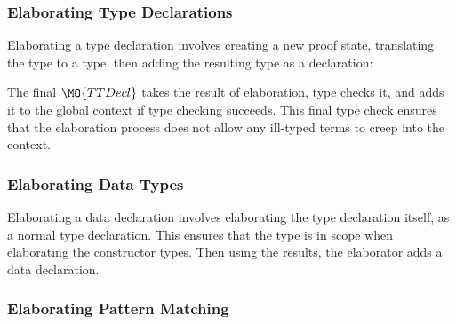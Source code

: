 \subsubsection{Elaborating Type Declarations}

Elaborating a type declaration involves creating a new proof state,
translating the \IdrisM{} type to a \TT{} type, then adding the resulting type
as a \TT{} declaration:


The final $\MO{TTDecl}$ takes the result of elaboration, type checks it,
and adds it to the global context if type checking succeeds. This final type check
ensures that the elaboration process does not allow any ill-typed terms to creep
into the context.

\subsubsection{Elaborating Data Types}

Elaborating a data declaration involves elaborating the type declaration itself,
as a normal type declaration. This ensures that the type is in scope when
elaborating the constructor types. Then using the results, the elaborator
adds a \TT{} data declaration.


\subsubsection{Elaborating Pattern Matching}

